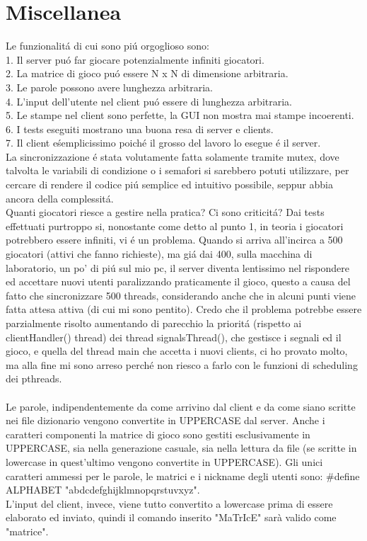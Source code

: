 \chapter{Miscellanea}

Le funzionalit\'a di cui sono pi\'u orgoglioso sono:
\\
1. Il server pu\'o far giocare potenzialmente infiniti giocatori.
\\
2. La matrice di gioco pu\'o essere N x N di dimensione arbitraria.
\\
3. Le parole possono avere lunghezza arbitraria.
\\
4. L'input dell'utente nel client pu\'o essere di lunghezza arbitraria.
\\
5. Le stampe nel client sono perfette, la GUI non mostra mai stampe incoerenti.
\\
6. I tests eseguiti mostrano una buona resa di server e clients.
\\
7. Il client e\' semplicissimo poich\'e il grosso del lavoro lo esegue \'e il server.
\\

La sincronizzazione \'e stata volutamente fatta solamente tramite mutex, dove talvolta le variabili di condizione o i semafori si sarebbero potuti utilizzare, per cercare di rendere il codice pi\'u semplice ed intuitivo possibile, seppur abbia ancora della complessit\'a.
\\
Quanti giocatori riesce a gestire nella pratica? Ci sono criticit\'a? Dai tests effettuati purtroppo si, nonostante come detto al punto 1, in teoria i giocatori potrebbero essere infiniti, vi \'e un problema. Quando si arriva all'incirca a 500 giocatori (attivi che fanno richieste), ma gi\'a dai 400, sulla macchina di laboratorio, un po' di pi\'u sul mio pc, il server diventa lentissimo nel rispondere ed accettare nuovi utenti paralizzando praticamente il gioco, questo a causa del fatto che sincronizzare 500 threads, considerando anche che in alcuni punti viene fatta attesa attiva (di cui mi sono pentito). Credo che il problema potrebbe essere parzialmente risolto aumentando di parecchio la priorit\'a (rispetto ai clientHandler() thread) dei thread signalsThread(), che gestisce i segnali ed il gioco, e quella del thread main che accetta i nuovi clients, ci ho provato molto, ma alla fine mi sono arreso perch\'e non riesco a farlo con le funzioni di scheduling dei pthreads.
 \\
 \\
 Le parole, indipendentemente da come arrivino dal client e da come siano scritte nei file dizionario vengono convertite in UPPERCASE dal server. Anche i caratteri componenti la matrice di gioco sono gestiti esclusivamente in UPPERCASE, sia nella generazione casuale, sia nella lettura da file (se scritte in lowercase in quest'ultimo vengono convertite in UPPERCASE). Gli unici caratteri ammessi per le parole, le matrici e i nickname degli utenti sono: \#define ALPHABET "abdcdefghijklmnopqrstuvxyz".
 \\
 L'input del client, invece, viene tutto convertito a lowercase prima di essere elaborato ed inviato, quindi il comando inserito "MaTrIcE" sarà valido come "matrice".
 
 